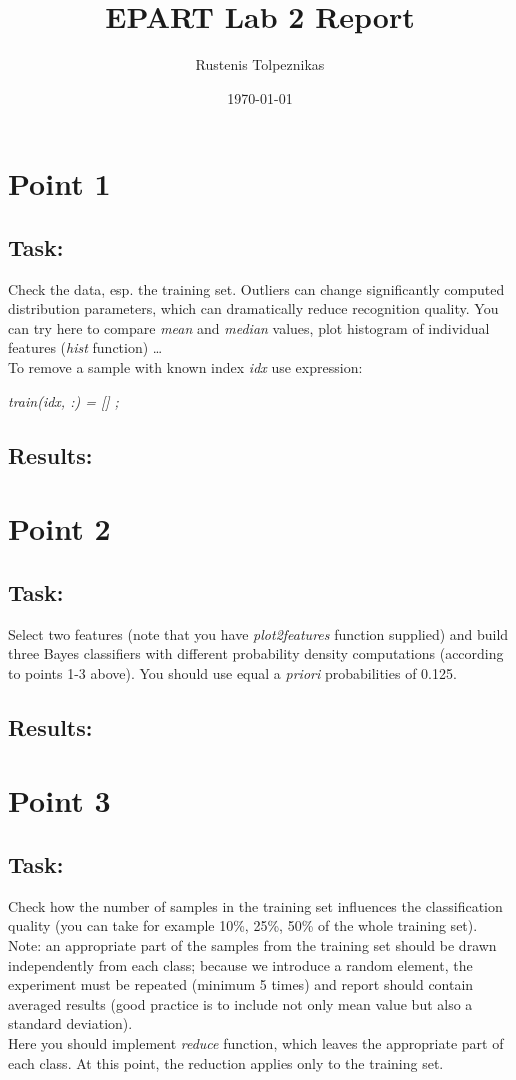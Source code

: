 \documentclass[
  a4paper,            %
  DIV=10,             %
  oneside,            %
  BCOR=5mm,           %
  parskip=half,       %
  numbers=noenddot,   %
  bibtotoc,           %
  listof=totoc        %
]{scrreprt}
\title{EPART Lab 2 Report}
\author{Rustenis Tolpeznikas}
\date{\today}
\begin{document}
\maketitle
\newpage

\section*{Point 1}
\subsection*{Task:}
Check the data, esp. the training set.
Outliers can change significantly computed distribution parameters, which can dramatically reduce recognition quality.
You can try here to compare \textit{mean} and \textit{median} values, plot histogram of individual features (\textit{hist} function) …
\\
To remove a sample with known index \textit{idx} use expression:
\begin{center}
    \textit{train(idx, :) = [] ;}
\end{center}

\subsection*{Results:}

\section*{Point 2}
\subsection*{Task:}
Select two features (note that you have \textit{plot2features} function supplied) and build three Bayes classifiers with different probability density computations (according to points 1-3 above).
You should use equal a \textit{priori} probabilities of 0.125.
\subsection*{Results:}

\section*{Point 3}
\subsection*{Task:}
Check how the number of samples in the training set influences the classification quality (you can take for example 10\%, 25\%, 50\% of the whole training set).
\\
Note: an appropriate part of the samples from the training set should be drawn independently from each class; because we introduce a random element, the experiment must be repeated (minimum 5 times) and report should contain averaged results (good practice is to include not only mean value but also a standard deviation).
\\
Here you should implement \textit{reduce} function, which leaves the appropriate part of each class.
At this point, the reduction applies only to the training set.
\end{document}
